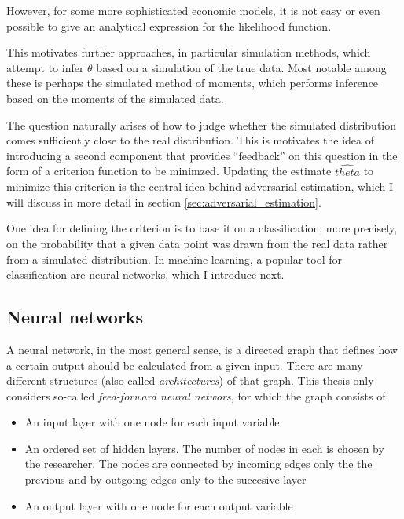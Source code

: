 However, for some more sophisticated economic models, it is not easy or even possible to give an analytical expression for the likelihood function.

This motivates further approaches, in particular simulation methods, which attempt to infer $\theta$ based on a simulation of the true data.
Most notable among these is perhaps the simulated method of moments, which performs inference based on the moments of the simulated data. %

The question naturally arises of how to judge whether the simulated distribution comes sufficiently close to the real distribution.
This is motivates the idea of introducing a second component that provides ``feedback'' on this question in the form of a criterion function to be minimzed.
Updating the estimate $\hat{theta}$ to minimize this criterion is the central idea behind adversarial estimation, which I will discuss in more detail in section \ref{sec:adversarial_estimation}.

One idea for defining the criterion is to base it on a classification, more precisely, on the probability that a given data point was drawn from the real data rather from a simulated distribution.
In machine learning, a popular tool for classification are neural networks, which I introduce next.

\subsection{Neural networks}
\label{sec:neural_networks}

A neural network, in the most general sense, is a directed graph that defines how a certain output should be calculated from a given input.
There are many different structures (also called \textit{architectures}) of that graph.
This thesis only considers so-called \textit{feed-forward neural networs}, for which the graph consists of:

\begin{itemize}
    \item An input layer with one node for each input variable
    \item An ordered set of hidden layers. The number of nodes in each is chosen by the researcher. The nodes are connected by incoming edges only the the previous and by outgoing edges only to the succesive layer
    \item An output layer with one node for each output variable
\end{itemize}


